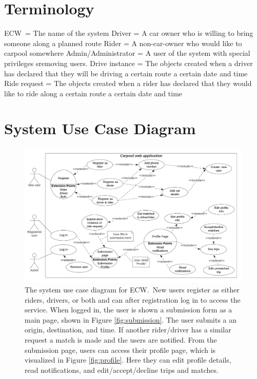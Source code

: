 \documentclass{article}
\newcommand{\name}{ECW\ }
\newcommand{\namep}{ECW.}
\begin{document}
\section{Terminology}
\name = The name of the system\newline
Driver = A car owner who is willing to bring someone along a planned route\newline
Rider = A non-car-owner who would like to carpool somewhere\newline
Admin/Administrator = A user of the system with special privileges sremoving users.\newline
Drive instance = The objects created when a driver has declared that they will be driving a certain route a certain date and time\newline
Ride request = The objects created when a rider has declared that they would like to ride along a certain route a certain date and time\newline

\newpage
\section{System Use Case Diagram}
\begin{figure}[!htpb]
    \centering
    \includegraphics[scale=0.8]{prdFigures/system_case_diagram.pdf}
    \caption{The system use case diagram for \namep \  New users register as either riders, drivers, or both and can after registration log in to access the service. When logged in, the user is shown a submission form as a main page, shown in Figure \ref{fig:submission}. The user submits a an origin, destination, and time. If another rider/driver has a similar request a match is made and the users are notified. From the submission page, users can access their profile page, which is visualized in Figure \ref{fig:profile}. Here they can edit profile details, read notifications, and edit/accept/decline trips and matches.}
    \label{fig:useCaseDiagram}
\end{figure}
\end{document}
